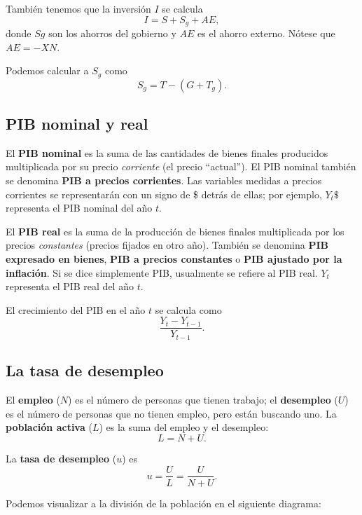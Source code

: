 \documentclass[10pt]{article}
\begin{document}
\begin{multicols*}{2}
También tenemos que la inversión $I$ se calcula
\[ I = S + S_g + AE, \]
donde $Sg$ son los ahorros del gobierno y $AE$ es el ahorro externo. Nótese que $AE = - XN$. 

Podemos calcular a $S_g$ como
\[ S_g = T - (G + T_g). \]

\subsection{PIB nominal y real}
El \textbf{PIB nominal} es la suma de las cantidades de bienes finales producidos multiplicada por su precio \textit{corriente} (el precio ``actual''). El PIB nominal también se denomina \textbf{PIB a precios corrientes}. Las variables medidas a precios corrientes se representarán con un signo de \$ detrás de ellas; por ejemplo, $Y_t\$$ representa el PIB nominal del año $t$.

El \textbf{PIB real} es la suma de la producción de bienes finales multiplicada por los precios \textit{constantes} (precios fijados en otro año). También se denomina \textbf{PIB expresado en bienes}, \textbf{PIB a precios constantes} o \textbf{PIB ajustado por la inflación}. Si se dice simplemente PIB, usualmente se refiere al PIB real. $Y_t$ representa el PIB real del año $t$.

El crecimiento del PIB en el año $t$ se calcula como
\[ \frac{Y_t - Y_{t-1}}{Y_{t-1}}. \]

\subsection{La tasa de desempleo}
El \textbf{empleo} ($N$) es el número de personas que tienen trabajo; el \textbf{desempleo} ($U$) es el número de personas que no tienen empleo, pero están buscando uno. La \textbf{población activa} ($L$) es la suma del empleo y el desempleo:
\[L = N + U.\]

La \textbf{tasa de desempleo} ($u$) es
\[ u = \frac{U}{L} = \frac{U}{N + U}. \]

Podemos visualizar a la división de la población en el siguiente diagrama:

\begin{center}
\end{center}


\end{multicols*}
\end{document}
